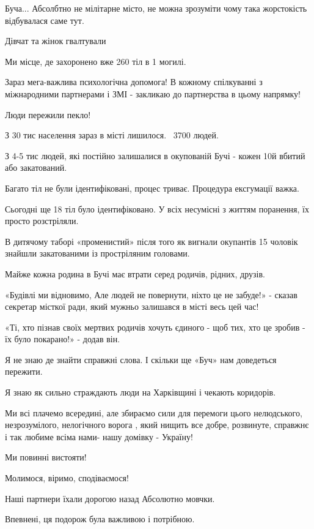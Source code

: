 Буча... Абсолбтно не мілітарне місто, не можна зрозуміти чому така жорстокість
відбувалася саме тут. 

Дівчат та жінок гвалтували

Ми місце, де захоронено вже 260 тіл в 1 могилі. 

Зараз мега-важлива психологічна допомога! В кожному спілкуванні з міжнародними
партнерами і ЗМІ - закликаю до партнерства в цьому напрямку!  

Люди пережили пекло!

З 30 тис населення зараз в місті лишилося. ~3700 людей. 

З 4-5 тис людей, які постійно залишалися  в окупованій Бучі - кожен 10й вбитий
або закатований.

Багато тіл не були ідентифіковані, процес триває. Процедура ексгумації важка. 

Сьогодні ще 18 тіл було ідентифіковано. У всіх несумісні з життям поранення, їх
просто розстріляли.

В дитячому таборі «променистий» після того як вигнали окупантів 15 чоловік
знайшли закатованими із простріляним головами.

Майже кожна родина в Бучі має втрати серед родичів, рідних, друзів.

«Будівлі ми відновимо, Але людей не повернути, ніхто це не забуде!» - сказав
секретар місткої ради, який мужньо залишався в місті весь цей час! 

«Ті, хто пізнав своїх мертвих родичів хочуть єдиного - щоб тих, хто це зробив -
їх було покарано!» - додав він. 

Я не знаю де знайти справжні слова. І скільки ще «Буч» нам доведеться пережити. 

Я знаю як сильно страждають люди на Харківщині і чекають коридорів. 

Ми всі плачемо всередині, але збираємо сили для перемоги цього нелюдського,
незрозумілого, нелогічного ворога , який нищить все добре, розвинуте, справжнє
і так любиме всіма нами- нашу домівку - Україну! 

Ми повинні вистояти!

Молимося, віримо, сподіваємося!

Наші партнери їхали дорогою назад Абсолютно мовчки. 

Впевнені, ця подорож була важливою і потрібною.
